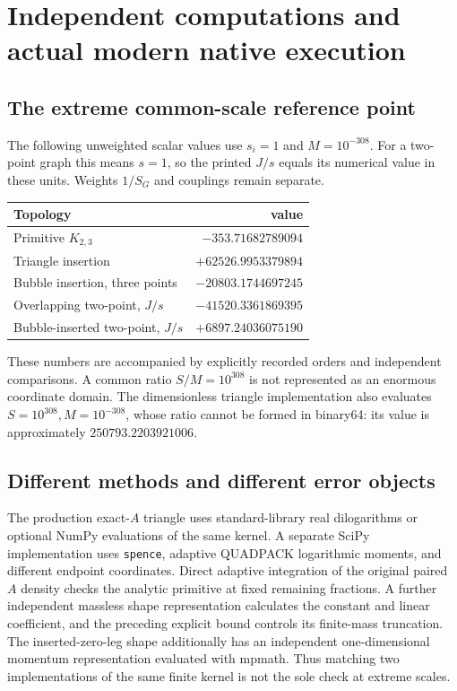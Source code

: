 \section{Independent computations and actual modern native execution}
\subsection{The extreme common-scale reference point}
The following unweighted scalar values use $s_i=1$ and $M=10^{-308}$.
For a two-point graph this means $s=1$, so the printed $J/s$ equals its
numerical value in these units. Weights $1/S_G$ and couplings remain separate.
\begin{center}\begin{tabular}{lr}\toprule Topology & value\\\midrule
Primitive $K_{2,3}$ & $-353.71682789094$\\
Triangle insertion & $+62526.9953379894$\\
Bubble insertion, three points & $-20803.1744697245$\\
Overlapping two-point, $J/s$ & $-41520.3361869395$\\
Bubble-inserted two-point, $J/s$ & $+6897.24036075190$\\\bottomrule
\end{tabular}\end{center}
These numbers are accompanied by explicitly recorded orders and independent
comparisons. A common ratio $S/M=10^{308}$ is not represented as an enormous
coordinate domain. The dimensionless triangle implementation also evaluates
$S=10^{308},M=10^{-308}$, whose ratio cannot be formed in binary64: its value
is approximately $250793.2203921006$.

\subsection{Different methods and different error objects}
The production exact-$A$ triangle uses standard-library real dilogarithms
or optional NumPy evaluations of the same kernel. A separate SciPy implementation
uses \texttt{spence}, adaptive QUADPACK logarithmic moments, and different
endpoint coordinates. Direct adaptive integration of the original paired
$A$ density checks the analytic primitive at fixed remaining fractions.
A further independent massless shape representation calculates the
constant and linear coefficient, and the preceding explicit bound controls
its finite-mass truncation. The inserted-zero-leg shape additionally has an
independent one-dimensional momentum representation evaluated with mpmath.
Thus matching two implementations of the same finite kernel is not the sole
check at extreme scales.

